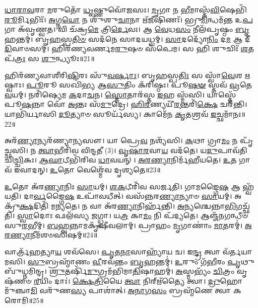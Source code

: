\-\ul{𑌧𑌾}\-\-\ul{𑌰𑌾}\-\-\ul{𑌵}\-𑌰𑌾 \ul{𑌮}\-𑌰𑍁𑌤𑍋᳴ \ul{𑌧𑍃}\-𑌷𑍍𑌣𑍁𑌵𑍋᳴𑌜𑌸𑌃।
\-\ul{𑌮𑍃}\-𑌗𑌾 𑌨 \ul{𑌭𑍀}\-𑌮𑌾𑌸𑍍𑌤᳴\-\ul{𑌵𑌿}\-𑌷𑍇𑌭𑌿᳴\-\-\ul{𑌰𑍂}\-𑌰𑍍𑌮𑌿𑌭𑌿𑌃᳴।
\-\ul{𑌅}\-𑌗𑍍𑌨\-\ul{𑌯𑍋} 𑌨 𑌶𑍁᳴𑌶𑍁\-\ul{𑌚𑌾}\-𑌨𑌾 𑌋᳴\-\ul{𑌜𑍀}\-𑌷𑌿𑌣𑌃᳴।
𑌭𑍍𑌰𑍁\-\ul{𑌮𑌿}\-𑌨𑍍𑌧𑌮᳴\-\ul{𑌨𑍍𑌤} 𑌉\-\ul{𑌪} 𑌗𑌾 𑌅᳴𑌵𑍃𑌣𑍍𑌵𑌤।
𑌵𑌿 𑌚᳴𑌕𑍍𑌰\-\ul{𑌮𑍇} 𑌤𑍍𑌰𑌿\-\ul{𑌰𑍍𑌦𑍇}\-𑌵𑌃।
𑌆 \ul{𑌵𑍇}\-𑌧\-\ul{𑌸𑌂} 𑌨𑍀𑌲᳴𑌪𑍃𑌷𑍍𑌠𑌂 \ul{𑌬𑍃}\-𑌹𑌨𑍍𑌤𑌮𑍍॑।
𑌬𑍃\-\ul{𑌹}\-𑌸𑍍𑌪\-\ul{𑌤𑌿}\-\-\ul{𑍞} 𑌸𑌦᳴𑌨𑍇 𑌸𑌾𑌦𑌯𑌧𑍍𑌵𑌮𑍍।
\-\ul{𑌸𑌾}\-𑌦𑌦𑍍𑌯𑍋᳴\-\ul{𑌨𑌿𑌂} 𑌦\-\ul{𑌮} 𑌆 𑌦𑍀᳴\-\ul{𑌦𑌿}\-𑌵𑌾𑍞𑌸𑌮𑍍॑।
𑌹𑌿𑌰᳴𑌣𑍍𑌯𑌵𑌰𑍍𑌣𑌮\-\ul{𑌰𑍁}\-𑌷𑍞 𑌸᳴𑌪𑍇𑌮।
𑌸 𑌹𑌿 𑌶𑍁𑌚𑌿𑌃᳴ \ul{𑌶}\-𑌤𑌪᳴\-\ul{𑌤𑍍𑌰𑌃} 𑌸 \ul{𑌶𑍁}\-𑌨𑍍𑌧𑍍𑌯𑍂𑌃॥21॥

𑌹𑌿𑌰᳴𑌣𑍍𑌯𑌵𑌾𑌶𑍀𑌰𑌿\-\ul{𑌷𑌿}\-𑌰𑌃 𑌸𑍁᳴\-\ul{𑌵}\-\-\ul{𑌰𑍍}\-𑌷𑌾𑌃।
𑌬𑍃\-\ul{𑌹}\-𑌸𑍍𑌪\-\ul{𑌤𑌿𑌃} 𑌸 𑌸𑍍𑌵𑌾᳴\-\ul{𑌵𑍇}\-𑌶 \ul{𑌋}\-𑌷𑍍𑌵𑌾𑌃।
\-\ul{𑌪𑍂}\-𑌰𑍂 𑌸𑌖𑌿᳴𑌭𑍍𑌯 𑌆\-\ul{𑌸𑍁}\-𑌤𑌿𑌂 𑌕᳴𑌰𑌿𑌷𑍍𑌠𑌃।
𑌪𑍂\-\ul{𑌷}\-\-\ul{𑍟} 𑌸𑍍𑌤𑌵᳴ \ul{𑌵𑍍𑌰}\-𑌤𑍇 \ul{𑌵}\-𑌯𑌮𑍍।
𑌨𑌰𑌿᳴𑌷𑍍𑌯𑍇𑌮 \ul{𑌕}\-𑌦𑌾\-\ul{𑌚}\-𑌨।
\-\ul{𑌸𑍍𑌤𑍋}\-𑌤𑌾𑌰᳴𑌸𑍍𑌤 \ul{𑌇}\-𑌹 𑌸𑍍𑌮᳴𑌸𑌿।
𑌯𑌾𑌸𑍍𑌤𑍇᳴ 𑌪𑍂\-\ul{𑌷}\-𑌨𑍍𑌨𑌾 𑌵𑍋᳴ \ul{𑌅}\-𑌨𑍍𑌤𑌃 𑌸᳴\-\ul{𑌮𑍁}\-𑌦𑍍𑌰𑍇।
\-\ul{𑌹𑌿}\-\-\ul{𑌰}\-𑌣𑍍𑌯𑌯𑍀᳴\-\ul{𑌰}\-𑌨𑍍𑌤𑌰𑌿᳴\-\ul{𑌕𑍍𑌷𑍇} 𑌚𑌰᳴𑌨𑍍𑌤𑌿।
𑌯𑌾𑌭𑌿᳴𑌰𑍍𑌯𑌾𑌸𑌿 \ul{𑌦𑍂}\-𑌤𑍍𑌯𑌾𑍞 𑌸𑍂𑌰𑍍𑌯᳴𑌸𑍍𑌯।
𑌕𑌾𑌮𑍇᳴𑌨 \ul{𑌕𑍃}\-𑌤𑌶𑍍𑌰𑌵᳴ \ul{𑌇}\-𑌚𑍍𑌛𑌮𑌾᳴𑌨𑌃॥22॥

𑌅𑌰᳴\-\ul{𑌣𑍍𑌯𑌾}\-𑌨𑍍𑌯𑌰᳴𑌣𑍍𑌯𑌾\-\ul{𑌨𑍍𑌯}\-𑌸𑍗।
𑌯𑌾 𑌪𑍍𑌰𑍇\-\ul{𑌵} 𑌨𑌶𑍍𑌯᳴𑌸𑌿।
\-\ul{𑌕}\-𑌥𑌾 𑌗𑍍𑌰𑌾\-\ul{𑌮𑌂} 𑌨 𑌪𑍃᳴𑌚𑍍𑌛𑌸𑌿।
𑌨 \ul{𑌤𑍍𑌵𑌾}\-𑌭𑍀𑌰𑌿᳴𑌵 𑌵𑌿𑌨𑍍𑌦𑌤𑍀 (3)।
\-\ul{𑌵𑍃}\-\-\ul{𑌷𑌾}\-\-\ul{𑌰}\-𑌵𑌾\-\ul{𑌯} 𑌵𑌦᳴𑌤𑍇।
𑌯\-\ul{𑌦𑍁}\-𑌪𑌾𑌵᳴𑌤𑌿 𑌚𑌿\-\ul{𑌚𑍍𑌚𑌿}\-𑌕𑌃।
\-\ul{𑌆}\-\-\ul{𑌘𑌾}\-𑌟𑍀𑌭𑌿᳴𑌰𑌿𑌵 \ul{𑌧𑌾}\-𑌵𑌯𑌨𑍍।
\-\ul{𑌅}\-\-\ul{𑌰}\-\-\ul{𑌣𑍍𑌯𑌾}\-𑌨𑌿𑌰𑍍𑌮᳴𑌹𑍀𑌯𑌤𑍇।
\-\ul{𑌉}\-𑌤 𑌗𑌾𑌵᳴ 𑌇𑌵𑌾𑌦𑌨𑍍।
\-\ul{𑌉}\-𑌤𑍋 𑌵𑍇𑌶𑍍𑌮𑍇᳴𑌵 𑌦𑍃𑌶𑍍𑌯𑌤𑍇॥23॥

\-\ul{𑌉}\-𑌤𑍋 𑌅᳴𑌰\-\ul{𑌣𑍍𑌯𑌾}\-𑌨𑌿𑌃 \ul{𑌸𑌾}\-𑌯𑌮𑍍।
\-\ul{𑌶}\-\-\ul{𑌕}\-𑌟𑍀𑌰𑌿᳴𑌵 𑌸𑌰𑍍𑌜𑌤𑌿।
𑌗𑌾\-\ul{𑌮}\-𑌙𑍍𑌗𑍈\-\ul{𑌷} 𑌆 𑌹𑍍𑌵᳴𑌯𑌤𑌿।
𑌦𑌾\-\ul{𑌰𑍍𑌵}\-𑌙𑍍𑌗𑍈\-\ul{𑌷} 𑌉𑌪𑌾᳴𑌵𑌧𑍀𑌤𑍍।
𑌵𑌸᳴𑌨𑍍𑌨𑌰\-\ul{𑌣𑍍𑌯𑌾}\-𑌨𑍍𑌯𑌾𑍞 \ul{𑌸𑌾}\-𑌯𑌮𑍍।
𑌅𑌕𑍍𑌰𑍁᳴\-\ul{𑌕𑍍𑌷}\-𑌦𑌿𑌤𑌿᳴ 𑌮𑌨𑍍𑌯𑌤𑍇।
𑌨 𑌵𑌾 𑌅᳴𑌰\-\ul{𑌣𑍍𑌯𑌾}\-𑌨𑌿𑌰𑍍\mbox{}𑌹᳴𑌨𑍍𑌤𑌿।
\-\ul{𑌅}\-𑌨𑍍𑌯𑌶𑍍𑌚𑍇𑌨𑍍𑌨𑌾\-\ul{𑌭𑌿}\-𑌗𑌚𑍍𑌛᳴𑌤𑌿।
\-\ul{𑌸𑍍𑌵𑌾}\-𑌦𑍋𑌃 𑌫𑌲᳴𑌸𑍍𑌯 \ul{𑌜}\-𑌗𑍍𑌧𑍍𑌵𑌾।
𑌯\-\ul{𑌤𑍍𑌰} 𑌕𑌾\-\ul{𑌮𑌂} 𑌨𑌿 𑌪᳴𑌦𑍍𑌯𑌤𑍇।
𑌆𑌞𑍍𑌜᳴𑌨𑌗𑌨𑍍𑌧𑍀𑍞 𑌸𑍁\-\ul{𑌰}\-𑌭𑍀𑌮𑍍।
\-\ul{𑌬}\-\-\ul{𑌹𑍍𑌵}\-𑌨𑍍𑌨𑌾𑌮𑌕𑍃᳴𑌷𑍀𑌵𑌲𑌾𑌮𑍍।
𑌪𑍍𑌰𑌾𑌹𑌂 \ul{𑌮𑍃}\-𑌗𑌾𑌣𑌾𑌂॑ \ul{𑌮𑌾}\-𑌤𑌰𑌮𑍍॑।
\-\ul{𑌅}\-\-\ul{𑌰}\-\-\ul{𑌣𑍍𑌯𑌾}\-𑌨𑍀𑌮᳴𑌶𑍞𑌸𑌿𑌷𑌮𑍍॥24॥\anuvakamend[\-\ul{𑌸𑍍𑌯𑌾}\-\-\ul{𑌮} \ul{𑌰𑍁}\-\-\ul{𑌰𑍋}\-\-\ul{𑌹} \ul{𑌯𑍁}\-\-\ul{𑌵𑌾}\-\-\ul{𑌨𑌃} \ul{𑌶𑍁}\-𑌨𑍍𑌧𑍍𑌯𑍂\-\ul{𑌰𑌿}\-𑌚𑍍𑌛𑌮𑌾᳴𑌨𑍋 𑌦𑍃𑌶𑍍𑌯\-\ul{𑌤𑍇} 𑌨𑌿𑌪᳴𑌦𑍍𑌯𑌤𑍇 \ul{𑌚}\-𑌤𑍍𑌵𑌾𑌰𑌿᳴ 𑌚]

𑌵𑌾𑌰𑍍𑌤𑍍𑌰᳴𑌹𑌤𑍍𑌯𑌾\-\ul{𑌯} 𑌶𑌵᳴𑌸𑍇।
\-\ul{𑌪𑍃}\-\-\ul{𑌤}\-\-\ul{𑌨𑌾}\-𑌸𑌾𑌹𑍍𑌯𑌾᳴𑌯 𑌚।
𑌇\-\ul{𑌨𑍍𑌦𑍍𑌰} 𑌤𑍍𑌵𑌾 𑌵᳴𑌰𑍍𑌤𑌯𑌾𑌮𑌸𑌿।
\-\ul{𑌸𑍁}\-𑌬𑍍𑌰𑌹𑍍𑌮𑌾᳴𑌣𑌂 \ul{𑌵𑍀}\-𑌰𑌵᳴𑌨𑍍𑌤𑌂 \ul{𑌬𑍃}\-𑌹𑌨𑍍𑌤𑌮𑍍॑।
\-\ul{𑌉}\-𑌰𑍁𑌂 𑌗᳴\-\ul{𑌭𑍀}\-𑌰𑌂 \ul{𑌪𑍃}\-𑌥𑍁𑌬𑍁᳴𑌧𑍍𑌨𑌮𑌿𑌨𑍍𑌦𑍍𑌰।
\-\ul{𑌶𑍍𑌰𑍁}\-𑌤𑌰𑍍\mbox{}𑌷𑌿᳴\-\ul{𑌮𑍁}\-𑌗𑍍𑌰𑌮᳴𑌭𑌿𑌮𑌾\-\ul{𑌤𑌿}\-𑌷𑌾𑌹𑌮𑍍॑।
\-\ul{𑌅}\-𑌸𑍍𑌮𑌭𑍍𑌯𑌂᳴ \ul{𑌚𑌿}\-𑌤𑍍𑌰𑌂 𑌵𑍃𑌷᳴𑌣𑍞 \ul{𑌰}\-𑌯𑌿𑌂 𑌦𑌾𑌃॑।
\-\ul{𑌕𑍍𑌷𑍇}\-\-\ul{𑌤𑍍𑌰𑌿}\-𑌯𑍈 \ul{𑌤𑍍𑌵𑌾} 𑌨𑌿𑌰𑍍\mbox{}𑌋᳴𑌤𑍍𑌯𑍈 𑌤𑍍𑌵𑌾।
\-\ul{𑌦𑍍𑌰𑍁}\-𑌹𑍋 𑌮𑍁᳴𑌞𑍍𑌚𑌾\-\ul{𑌮𑌿} 𑌵𑌰𑍁᳴𑌣\-\ul{𑌸𑍍𑌯} 𑌪𑌾𑌶𑌾॑𑌤𑍍।
\-\ul{𑌅}\-\-\ul{𑌨𑌾}\-𑌗\-\ul{𑌸𑌂} 𑌬𑍍𑌰𑌹𑍍𑌮᳴𑌣𑍇 𑌤𑍍𑌵𑌾 𑌕𑌰𑍋𑌮𑌿॥25॥

